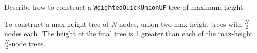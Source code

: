 \question Describe how to construct a \texttt{WeightedQuickUnionUF} tree of maximum height.

\begin{solution}[0.5in]
To construct a max-height tree of $N$ nodes, union two max-height trees with $\frac{N}{2}$ nodes each. The height of the final tree is 1 greater than each of the max-height $\frac{N}{2}$-node trees.
\end{solution}